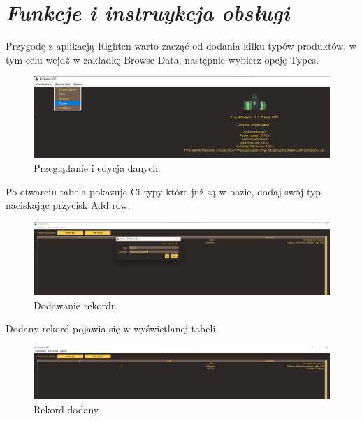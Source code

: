 \documentclass[a4paper,10pt, twoside]{report}
\newcommand{\customstylesection}[1]{\textbf{\textit{#1}}}
\begin{document}
\section{\customstylesection{Funkcje i instruykcja obsługi}}
{Przygodę z aplikacją Righten warto zacząć od dodania kilku typów produktów, 
w tym celu wejdź w zakładkę Browse Data, następnie wybierz opcję Types.}

\begin{figure}[H]           %
    \caption{Przeglądanie i edycja danych}
    \label{fig:Przeglądanie i edycja danych}
    \centering
    \includegraphics[width=12cm]{figures/Guide/Righten_Instruction_04_browse_p1.png}
\end{figure}

{Po otwarciu tabela pokazuje Ci typy które już są w bazie, dodaj swój typ 
naciskając przycisk Add row.}

\begin{figure}[H]           %
    \caption{Dodawanie rekordu}
    \label{fig:Dodawanie rekordu}
    \centering
    \includegraphics[width=12cm]{figures/Guide/Righten_Instruction_04_browse_p2_add_data.png}
\end{figure}

{Dodany rekord pojawia się w wyświetlanej tabeli.}

\begin{figure}[H]           %
    \caption{Rekord dodany}
    \label{fig:Rekord dodany}
    \centering
    \includegraphics[width=12cm]{figures/Guide/Righten_Instruction_04_browse_p3_add_data_success.png}
\end{figure}
\end{document}
